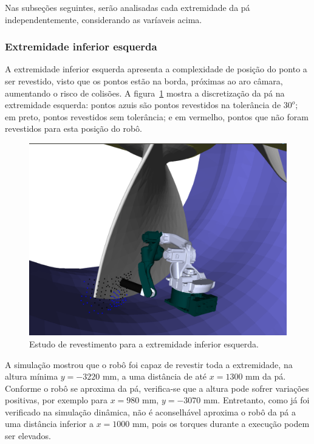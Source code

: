 Nas subseções seguintes, serão analisadas cada extremidade da
pá independentemente, considerando as varíaveis acima.

\subsubsection{Extremidade inferior esquerda}

A extremidade inferior esquerda apresenta a complexidade de posição do ponto a
ser revestido, visto que os pontos estão na borda, próximas ao aro câmara,
aumentando o risco de colisões. A figura~\ref{fig::footleft} mostra a
discretização da pá na extremidade esquerda: pontos azuis são pontos revestidos
na tolerância de $30^o$; em preto, pontos revestidos sem tolerância; e em
vermelho, pontos que não foram revestidos para esta posição do robô.

\begin{figure}[!ht]
	\centering	
	\includegraphics[width=1\columnwidth]{figs/footleft.png}
	\caption{Estudo de revestimento para a extremidade inferior esquerda.}
	\label{fig::footleft}
\end{figure}

A simulação mostrou que o robô foi capaz de revestir toda a extremidade, na
altura mínima $y=-3220$ mm, a uma distância de até $x=1300$ mm da pá. Conforme o
robô se aproxima da pá, verifica-se que a altura pode sofrer variações
positivas, por exemplo para $x=980$ mm, $y=-3070$ mm. Entretanto, como já foi
verificado na simulação dinâmica, não é aconselhável aproxima o robô da pá a uma
distância inferior a $x=1000$ mm, pois os torques durante a execução podem ser
elevados.

